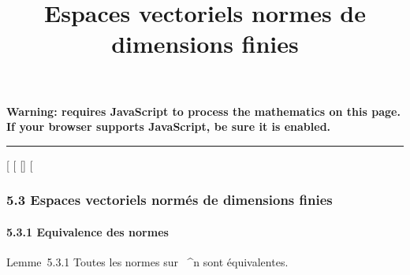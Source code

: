 \documentclass[]{article}
\title{Espaces vectoriels normes de dimensions finies}
\author{}
\date{}
\begin{document}
\maketitle

\textbf{Warning: 
requires JavaScript to process the mathematics on this page.\\ If your
browser supports JavaScript, be sure it is enabled.}

\begin{center}\rule{3in}{0.4pt}\end{center}

{[}
{[}
{[}{]}
{[}

\subsubsection{5.3 Espaces vectoriels normés de dimensions finies}

\paragraph{5.3.1 Equivalence des normes}

Lemme~5.3.1 Toutes les normes sur ~^n sont équivalentes.
\end{document}
